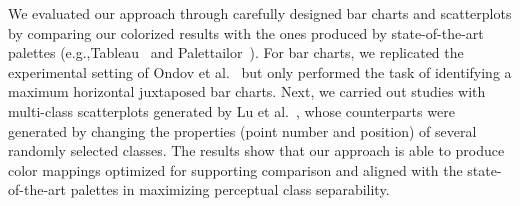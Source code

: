 
We evaluated our approach through carefully designed bar charts and scatterplots by comparing our colorized results with the ones produced by state-of-the-art palettes (e.g.,Tableau~\cite{tableau} and Palettailor~\cite{Lu21}). For bar charts, we replicated the experimental setting of Ondov et al.~\cite{Ondov19} but only performed the task of identifying a maximum  horizontal juxtaposed bar charts.
Next, we carried out studies with multi-class scatterplots generated by Lu et al.~\cite{Lu21}, whose counterparts were generated by changing the properties (point number and position) of several randomly selected classes.
The results show that our approach is able to produce color mappings optimized for supporting comparison and aligned with the state-of-the-art palettes in maximizing perceptual class separability.

